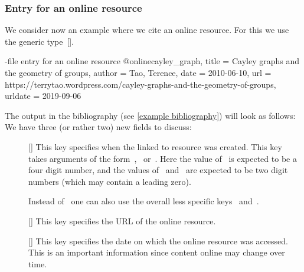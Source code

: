 \subsubsection{Entry for an online resource}

We consider now an example where we cite an online resource.
For this we use the generic type~[\atname].
\begin{showcode}[label = {bib entry online}]{-file entry for an online resource}
@online{cayley_graph,
  title   = {Cayley graphs and the geometry of groups},
  author  = {Tao, Terence},
  date    = {2010-06-10},
  url     = {https://terrytao.wordpress.com/cayley-graphs-and-the-geometry-of-groups},
  urldate = {2019-09-06}
}
\end{showcode}
The output in the bibliography (see \cref{example bibliography}) will look as follows:
We have three (or rather two) new fields to discuss:
\begin{description}
  \item[]
    [\optname]
    This key specifies when the linked to resource was created.
    This key takes arguments of the form~,~ or~.
    Here the value of~ is expected to be a four digit number, and the values of~ and~ are expected to be two digit numbers (which may contain a leading zero).
    
    Instead of~ one can also use the overall less specific keys~ and~.
  \item[]
    [\optname]
    This key specifies the URL of the online resource.
  \item[]
    [\optname]
    This key specifies the date on which the online resource was accessed.
    This is an important information since content online may change over time.
\end{description}


